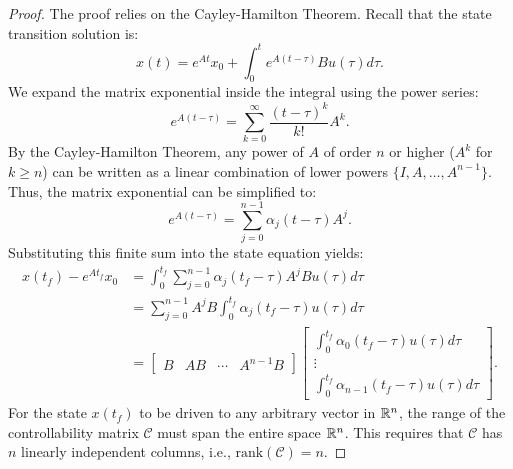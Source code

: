 \begin{proof}
The proof relies on the Cayley-Hamilton Theorem. Recall that the state transition solution is:
\begin{equation}
x(t) = e^{At} x_0 + \int_0^t e^{A(t-\tau)} B u(\tau) d\tau .
\end{equation}
We expand the matrix exponential inside the integral using the power series:
\begin{equation}
e^{A(t-\tau)} = \sum_{k=0}^\infty \frac{(t-\tau)^k}{k!} A^k .
\end{equation}
By the Cayley-Hamilton Theorem, any power of $A$ of order $n$ or higher ($A^k$ for $k \ge n$) can be written as a linear combination of lower powers $\{I, A, \dots, A^{n-1}\}$. Thus, the matrix exponential can be simplified to:
\begin{equation}
e^{A(t-\tau)} = \sum_{j=0}^{n-1} \alpha_j(t-\tau) A^j .
\end{equation}
Substituting this finite sum into the state equation yields:
\begin{align}
    x(t_f) - e^{At_f} x_0 &= \int_0^{t_f} \sum_{j=0}^{n-1} \alpha_j(t_f-\tau) A^j B u(\tau) d\tau \nonumber \\
    &= \sum_{j=0}^{n-1} A^j B \int_0^{t_f} \alpha_j(t_f-\tau) u(\tau) d\tau \nonumber \\
&= \begin{bmatrix} B & AB & \cdots & A^{n-1}B \end{bmatrix} \begin{bmatrix} \int_0^{t_f} \alpha_0(t_f-\tau) u(\tau) d\tau \\ \vdots \\ \int_0^{t_f} \alpha_{n-1}(t_f-\tau) u(\tau) d\tau \end{bmatrix} .
\end{align}
For the state $x(t_f)$ to be driven to any arbitrary vector in $\mathbb{R}^n$, the range of the controllability matrix $\mathcal{C}$ must span the entire space $\mathbb{R}^n$. This requires that $\mathcal{C}$ has $n$ linearly independent columns, i.e., $\text{rank}(\mathcal{C}) = n$.
\end{proof}

